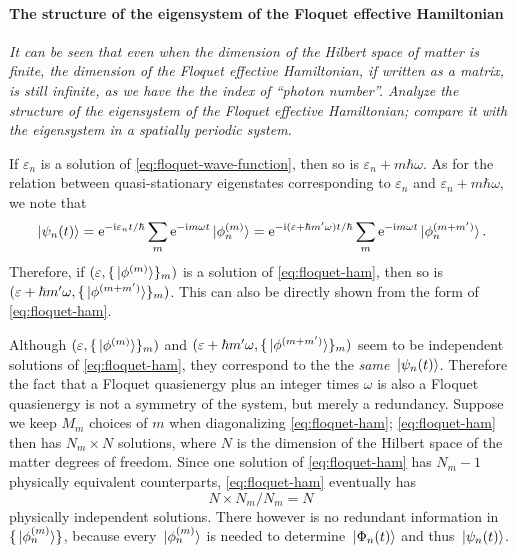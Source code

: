 \documentclass[hyperref, a4paper]{article}
\newcommand*{\ii}{\mathrm{i}}
\newcommand*{\ee}{\mathrm{e}}
\begin{document}
\paragraph*{The structure of the eigensystem of the Floquet effective Hamiltonian} 
\textit{
It can be seen that even when the dimension of the Hilbert space of matter is finite, 
the dimension of the Floquet effective Hamiltonian, if written as a matrix, 
is still infinite,
as we have the the index of ``photon number''.
Analyze the structure of the eigensystem of the Floquet effective Hamiltonian; 
compare it with the eigensystem in a spatially periodic system. 
}

If $\varepsilon_n$ is a solution of \eqref{eq:floquet-wave-function},
then so is $\varepsilon_n + m \hbar \omega$.
As for the relation between quasi-stationary eigenstates corresponding to 
$\varepsilon_n$ and $\varepsilon_n + m \hbar \omega$, 
we note that 
\begin{equation}
    \ket*{\psi_n(t)} = \ee^{- \ii \varepsilon_n t / \hbar} \sum_m \ee^{- \ii m \omega t} \ket*{\phi_n^{(m)}}
    = \ee^{- \ii (\varepsilon + \hbar m' \omega) t / \hbar}
    \sum_m \ee^{- \ii m \omega t} \ket*{\phi_n^{(m + m')}}.
\end{equation}
Therefore, if $(\varepsilon, \{\ket*{\phi^{(m)}}\}_m)$ 
is a solution of \eqref{eq:floquet-ham},
then so is $(\varepsilon + \hbar m' \omega, \{\ket*{\phi^{(m + m')}}\}_m)$.
This can also be directly shown from the form of \eqref{eq:floquet-ham}.

Although $(\varepsilon, \{\ket*{\phi^{(m)}}\}_m)$ and 
$(\varepsilon + \hbar m' \omega, \{\ket*{\phi^{(m + m')}}\}_m)$ 
seem to be independent solutions of \eqref{eq:floquet-ham},
they correspond to the the \emph{same} $\ket*{\psi_n(t)}$.
Therefore the fact that a Floquet quasienergy plus an integer times $\omega$
is also a Floquet quasienergy 
is not a symmetry of the system, but merely a redundancy.
Suppose we keep $M_m$ choices of $m$ when diagonalizing \eqref{eq:floquet-ham};
\eqref{eq:floquet-ham} then has $N_m \times N$ solutions, 
where $N$ is the dimension of the Hilbert space of the matter degrees of freedom.
Since one solution of \eqref{eq:floquet-ham} has $N_m - 1$ physically equivalent counterparts, 
\eqref{eq:floquet-ham} eventually has 
\[
    N \times N_m / N_m = N
\]
physically independent solutions.
There however is no redundant information in $\{\ket*{\phi_n^{(m)}}\}$,
because every $\ket*{\phi_n^{(m)}}$ is needed to determine $\ket*{\Phi_n(t)}$
and thus $\ket*{\psi_n(t)}$.
\end{document}
